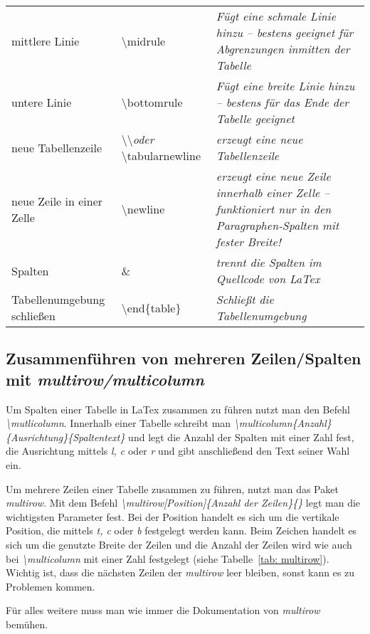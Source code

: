 \begin{longtable}[l]{p{}p{}p{}}
mittlere Linie & \textbackslash midrule & \textit{Fügt eine schmale Linie hinzu -- bestens geeignet für Abgrenzungen inmitten der Tabelle}\tabularnewline%
untere Linie & \textbackslash bottomrule & \textit{Fügt eine breite Linie hinzu -- bestens für das Ende der Tabelle geeignet}\tabularnewline%
\midrule%
neue Tabellenzeile & \textbackslash \textbackslash \emph{oder} \textbackslash tabularnewline & \textit{erzeugt eine neue Tabellenzeile}\tabularnewline%
neue Zeile in einer Zelle & \textbackslash newline & \textit{erzeugt eine neue Zeile innerhalb einer Zelle -- funktioniert nur in den Paragraphen-Spalten mit fester Breite!}\tabularnewline%
Spalten & \& & \textit{trennt die Spalten im Quellcode von LaTex}\tabularnewline
Tabellenumgebung schließen & \textbackslash end\{table\} & \emph{Schließt die Tabellenumgebung}\tabularnewline%
\end{longtable}%
%
\subsection{Zusammenführen von mehreren Zeilen/Spalten mit \emph{multirow/multicolumn}}%
Um Spalten einer Tabelle in LaTex zusammen zu führen nutzt man den Befehl \emph{\textbackslash mutlicolumn}. Innerhalb einer Tabelle schreibt man \emph{\textbackslash multicolumn\{Anzahl\}\{Ausrichtung\}\{Spaltentext\}} und legt die Anzahl der Spalten mit einer Zahl fest, die Ausrichtung mittels \emph{l, c} oder \emph{r} und gibt anschließend den Text seiner Wahl ein.%
 
Um mehrere Zeilen einer Tabelle zusammen zu führen, nutzt man das Paket \emph{multirow}. Mit dem Befehl \emph{\textbackslash multirow[Position]\{Anzahl der Zeilen\}\{\textasteriskcentered\}} legt man die wichtigsten Parameter fest. Bei der Position handelt es sich um die vertikale Position, die mittels \emph{t, c} oder \emph{b} festgelegt werden kann. Beim Zeichen \emph{\textasteriskcentered} handelt es sich um die genutzte Breite der Zeilen und die Anzahl der Zeilen wird wie auch bei \emph{\textbackslash multicolumn} mit einer Zahl festgelegt (siehe Tabelle~\ref{tab: multirow}). Wichtig ist, dass die nächsten Zeilen der \emph{multirow} leer bleiben, sonst kann es zu Problemen kommen.%

Für alles weitere muss man wie immer die Dokumentation von \emph{multirow} bemühen.%

